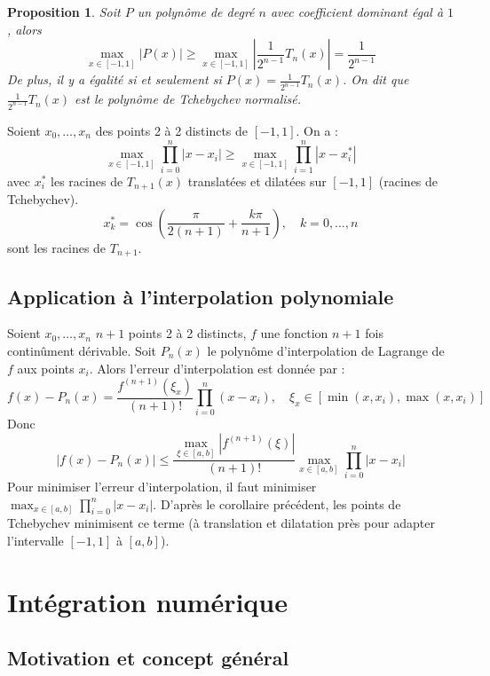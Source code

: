 \documentclass{article}
\newtheorem{proposition}[theorem]{Proposition}
\begin{document}
\begin{proposition}
Soit $P$ un polynôme de degré $n$ avec coefficient dominant égal à $1$, alors
\[
\max_{x \in [-1, 1]} |P(x)| \geq \max_{x \in [-1, 1]} \left|\frac{1}{2^{n-1}}T_n(x)\right| = \frac{1}{2^{n-1}}
\]
De plus, il y a égalité si et seulement si $P(x) = \frac{1}{2^{n-1}}T_n(x)$.
On dit que $\frac{1}{2^{n-1}}T_n(x)$ est le polynôme de Tchebychev normalisé.
\end{proposition}

\begin{corollary}
Soient $x_0, \dots, x_n$ des points 2 à 2 distincts de $[-1, 1]$.
On a :
\[
\max_{x \in [-1, 1]} \prod_{i=0}^{n} |x - x_i| \geq \max_{x \in [-1, 1]} \prod_{i=1}^{n} |x - x_i^*|
\]
avec $x_i^*$ les racines de $T_{n+1}(x)$ translatées et dilatées sur $[-1, 1]$ (racines de Tchebychev).
\[
x_k^* = \cos\left(\frac{\pi}{2(n+1)} + \frac{k\pi}{n+1}\right), \quad k = 0, \dots, n
\]
sont les racines de $T_{n+1}$.

\end{corollary}

\subsection{Application à l'interpolation polynomiale}

Soient $x_0, \dots, x_n$ $n+1$ points 2 à 2 distincts, $f$ une fonction $n+1$ fois continûment dérivable.
Soit $P_n(x)$ le polynôme d'interpolation de Lagrange de $f$ aux points $x_i$.
Alors l'erreur d'interpolation est donnée par :
\[
f(x) - P_n(x) = \frac{f^{(n+1)}(\xi_x)}{(n+1)!} \prod_{i=0}^{n} (x - x_i), \quad \xi_x \in [\min(x, x_i), \max(x, x_i)]
\]
Donc
\[
|f(x) - P_n(x)| \leq \frac{\max_{\xi \in [a, b]} |f^{(n+1)}(\xi)|}{(n+1)!} \max_{x \in [a, b]} \prod_{i=0}^{n} |x - x_i|
\]
Pour minimiser l'erreur d'interpolation, il faut minimiser $\max_{x \in [a, b]} \prod_{i=0}^{n} |x - x_i|$.
D'après le corollaire précédent, les points de Tchebychev minimisent ce terme (à translation et dilatation près pour adapter l'intervalle $[-1, 1]$ à $[a, b]$).

\section{Intégration numérique}

\subsection{Motivation et concept général}
\end{document}
